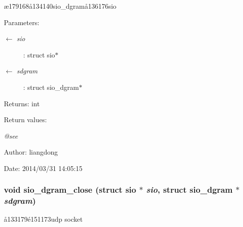 \ae{}179168\aa{}134140sio\_\-dgram\aa{}136176sio 

\begin{Desc}
\item[Parameters:]
\begin{description}
\item[\mbox{$\leftarrow$} {\em sio}]: struct sio$\ast$ \item[\mbox{$\leftarrow$} {\em sdgram}]: struct sio\_\-dgram$\ast$ \end{description}
\end{Desc}
\begin{Desc}
\item[Returns:]int \end{Desc}
\begin{Desc}
\item[Return values:]
\begin{description}
\item[{\em @see}]\end{description}
\end{Desc}
\begin{Desc}
\item[Author:]liangdong \end{Desc}
\begin{Desc}
\item[Date:]2014/03/31 14:05:15 \end{Desc}
\subsubsection{\setlength{\rightskip}{0pt plus 5cm}void sio\_\-dgram\_\-close (struct sio $\ast$ {\em sio}, struct sio\_\-dgram $\ast$ {\em sdgram})}\label{sio__dgram_8c_a3}


\aa{}133179\'{e}151173udp socket 

